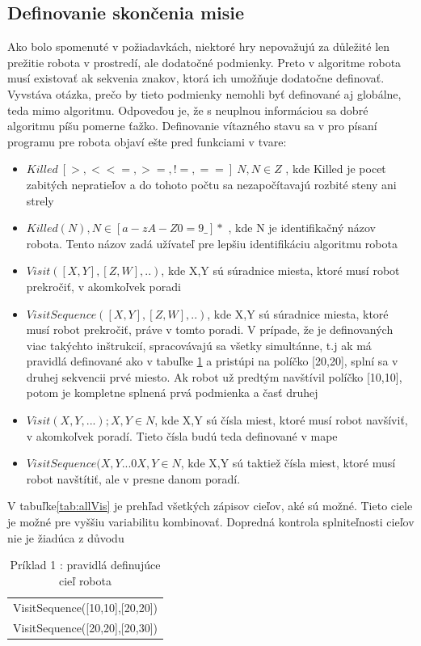\subsection{ Definovanie skončenia misie }
Ako bolo spomenuté v požiadavkách, niektoré hry nepovažujú za důležité len prežitie robota v prostredí, ale dodatočné podmienky. Preto v algoritme robota musí existovať ak sekvenia znakov, ktorá ich umožňuje dodatočne definovať. Vyvstáva otázka, prečo by tieto podmienky nemohli byť definované aj globálne, teda mimo algoritmu. Odpoveďou je, že s neuplnou informáciou sa dobré algoritmu píšu pomerne ťažko.%
Definovanie vítazného stavu sa v pro písaní programu pre robota objaví ešte pred funkciami v tvare:
\begin{itemize}
\item $Killed\ [>, < <=, >=, !=, ==]\ N, N \in Z$ , kde Killed je pocet zabitých nepratieľov a do tohoto počtu sa nezapočítavajú rozbité steny ani strely
\item $Killed( N ), N \in [a-zA-Z0=9\_]*$ , kde N je identifikačný názov robota. Tento názov zadá užívateľ pre lepšiu identifikáciu algoritmu robota
\item $Visit([X,Y], [Z,W],..)$, kde X,Y sú súradnice miesta, ktoré musí robot prekročiť, v akomkoľvek poradi
\item $VisitSequence([X,Y], [Z,W],..)$, kde X,Y sú súradnice miesta, ktoré musí robot prekročiť, práve v tomto poradi. V prípade, že je definovaných viac takýchto inštrukcií, spracovávajú sa všetky simultánne, t.j ak má pravidlá definované ako v tabuľke \ref{tab:pr1} a pristúpi na políčko [20,20], splní sa v druhej sekvencii prvé miesto. Ak robot už predtým navštívil políčko [10,10], potom je kompletne splnená prvá podmienka a časť druhej
\item $Visit(X, Y,...); X,Y \in N $, kde X,Y sú čísla miest, ktoré musí robot navšíviť, v akomkoľvek poradí. Tieto čísla budú teda definované v mape
\item $VisitSequence(X,Y...0 X,Y \in N$, kde X,Y sú taktiež čísla miest, ktoré musí robot navštítiť, ale v presne danom poradí.
\end{itemize}
V tabuľke\ref{tab:allVis} je prehľad všetkých zápisov cieľov, aké sú možné. Tieto ciele je možné pre vyššiu variabilitu kombinovať. Dopredná kontrola splniteľnosti cieľov nie je žiadúca z důvodu
\begin{table}
\centering
\begin{tabular}{l}
VisitSequence([10,10],[20,20])\\
VisitSequence([20,20],[20,30])\\
\end{tabular}
\caption {Príklad 1 : pravidlá definujúce cieľ robota} %
\label{tab:pr1}
\end{table}

